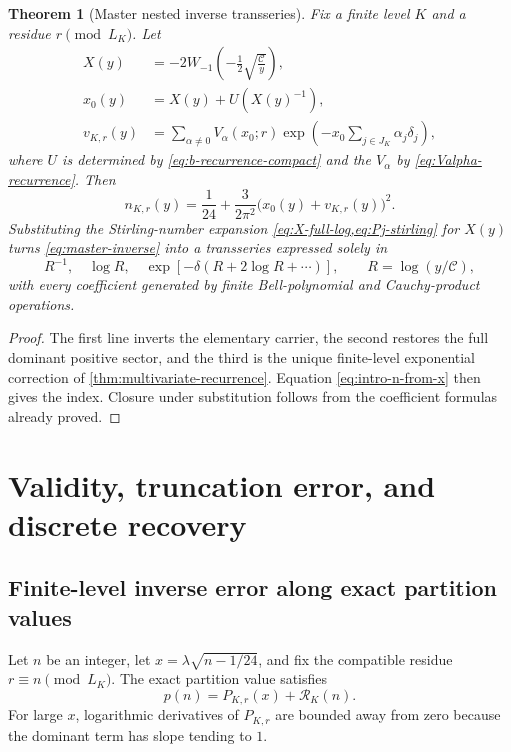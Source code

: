 \documentclass[11pt,a4paper]{article}
\numberwithin{equation}{section}
\newtheorem{theorem}{Theorem}[section]
\theoremstyle{remark}
\newcommand{\Ccal}{\mathcal C}
\newcommand{\Rcal}{\mathcal R}
\begin{document}
\begin{theorem}[Master nested inverse transseries]\label{thm:master-inverse}
Fix a finite level $K$ and a residue $r\pmod{L_K}$.  Let
\begin{align*}
 X(y)&=-2W_{-1}\!\left(-\frac12\sqrt{\frac{\Ccal}{y}}\right),\\
 x_0(y)&=X(y)+U(X(y)^{-1}),\\
 v_{K,r}(y)&=\sum_{\alpha\ne0}V_\alpha(x_0;r)
 \exp\!\left(-x_0\sum_{j\in J_K}\alpha_j\delta_j\right),
\end{align*}
where $U$ is determined by \cref{eq:b-recurrence-compact} and the $V_\alpha$ by \cref{eq:Valpha-recurrence}.  Then
\begin{equation}\label{eq:master-inverse}
 \boxed{
 n_{K,r}(y)=\frac1{24}+\frac{3}{2\pi^2}
 \bigl(x_0(y)+v_{K,r}(y)\bigr)^2.}
\end{equation}
Substituting the Stirling-number expansion \cref{eq:X-full-log,eq:Pj-stirling} for $X(y)$ turns \cref{eq:master-inverse} into a transseries expressed solely in
\[
 R^{-1},\quad \log R,\quad
 \exp\!\left[-\delta\left(R+2\log R+\cdots\right)\right],
 \qquad R=\log(y/\Ccal),
\]
with every coefficient generated by finite Bell-polynomial and Cauchy-product operations.
\end{theorem}

\begin{proof}
The first line inverts the elementary carrier, the second restores the full dominant positive sector, and the third is the unique finite-level exponential correction of \cref{thm:multivariate-recurrence}.  Equation \cref{eq:intro-n-from-x} then gives the index.  Closure under substitution follows from the coefficient formulas already proved.
\end{proof}

\section{Validity, truncation error, and discrete recovery}\label{sec:validity}

\subsection{Finite-level inverse error along exact partition values}

Let $n$ be an integer, let $x=\lambda\sqrt{n-1/24}$, and fix the compatible residue $r\equiv n\pmod{L_K}$.  The exact partition value satisfies
\begin{equation}
 p(n)=P_{K,r}(x)+\Rcal_K(n).
\end{equation}
For large $x$, logarithmic derivatives of $P_{K,r}$ are bounded away from zero because the dominant term has slope tending to $1$.
\end{document}
